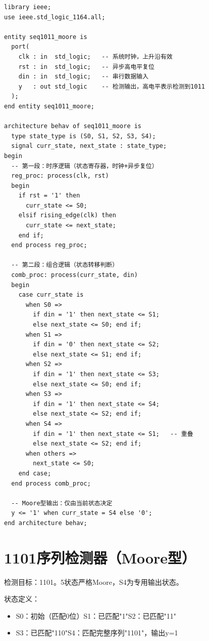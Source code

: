 \begin{lstlisting}[caption={Moore型1011序列检测器（5状态，可重叠）}]
library ieee;
use ieee.std_logic_1164.all;

entity seq1011_moore is
  port(
    clk : in  std_logic;   -- 系统时钟，上升沿有效
    rst : in  std_logic;   -- 异步高电平复位
    din : in  std_logic;   -- 串行数据输入
    y   : out std_logic    -- 检测输出，高电平表示检测到1011
  );
end entity seq1011_moore;

architecture behav of seq1011_moore is
  type state_type is (S0, S1, S2, S3, S4);
  signal curr_state, next_state : state_type;
begin
  -- 第一段：时序逻辑（状态寄存器，时钟+异步复位）
  reg_proc: process(clk, rst)
  begin
    if rst = '1' then
      curr_state <= S0;
    elsif rising_edge(clk) then
      curr_state <= next_state;
    end if;
  end process reg_proc;

  -- 第二段：组合逻辑（状态转移判断）
  comb_proc: process(curr_state, din)
  begin
    case curr_state is
      when S0 =>
        if din = '1' then next_state <= S1;
        else next_state <= S0; end if;
      when S1 =>
        if din = '0' then next_state <= S2;
        else next_state <= S1; end if;
      when S2 =>
        if din = '1' then next_state <= S3;
        else next_state <= S0; end if;
      when S3 =>
        if din = '1' then next_state <= S4;
        else next_state <= S2; end if;
      when S4 =>
        if din = '1' then next_state <= S1;   -- 重叠
        else next_state <= S2; end if;
      when others =>
        next_state <= S0;
    end case;
  end process comb_proc;

  -- Moore型输出：仅由当前状态决定
  y <= '1' when curr_state = S4 else '0';
end architecture behav;
\end{lstlisting}

\section{1101序列检测器（Moore型）}

检测目标：1101。5状态严格Moore，S4为专用输出状态。

状态定义：
\begin{itemize}
  \item S0：初始（匹配0位）\quad S1：已匹配"1"\quad S2：已匹配"11"
  \item S3：已匹配"110"\quad S4：匹配完整序列"1101"，输出y=1
\end{itemize}


